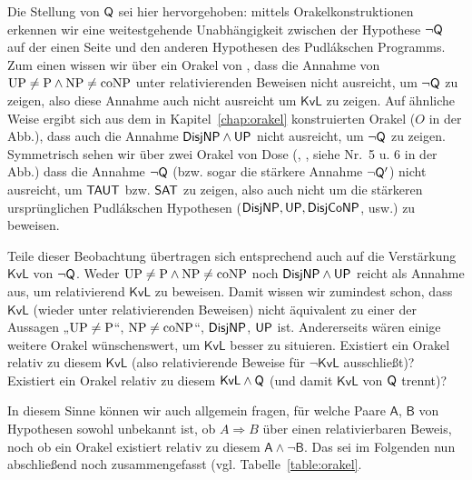 Die Stellung von $\mathsf{Q}$ sei hier hervorgehoben: mittels Orakelkonstruktionen erkennen wir eine weitestgehende Unabhängigkeit zwischen der Hypothese $\neg\mathsf{Q}$ auf der einen Seite und den anderen Hypothesen des Pudlákschen Programms. Zum einen wissen wir über ein Orakel von \textcite[Thm.~12.3, Nr.~8 in der Abb.]{fenner_inverting_2003}, dass die Annahme von $\mathrm{UP}\neq\mathrm{P}\land \mathrm{NP}\neq\mathrm{coNP}$ unter relativierenden Beweisen nicht ausreicht, um $\neg\mathsf{Q}$ zu zeigen, also diese Annahme auch nicht ausreicht um $\mathsf{KvL}$ zu zeigen.
Auf ähnliche Weise ergibt sich aus dem in Kapitel~\ref{chap:orakel} konstruierten Orakel ($O$ in der Abb.), dass auch die Annahme $\mathsf{DisjNP}\land\mathsf{UP}$ nicht ausreicht, um $\neg\mathsf{Q}$ zu zeigen.
Symmetrisch sehen wir über zwei Orakel von Dose (\cite*[Cor.~3.3]{dose_oracle_2020}, \cite*[Thm.~3.2]{dose_further_2020}, siehe Nr.~5 u. 6 in der Abb.) dass die Annahme $\neg\mathsf{Q}$ (bzw. sogar die stärkere Annahme $\neg\mathsf{Q}'$) nicht ausreicht, um $\mathsf{TAUT}$ bzw. $\mathsf{SAT}$ zu zeigen, also auch nicht um die stärkeren ursprünglichen Pudlákschen Hypothesen ($\mathsf{DisjNP}, \mathsf{UP}, \mathsf{DisjCoNP}$, usw.) zu beweisen.

Teile dieser Beobachtung übertragen sich entsprechend auch auf die Verstärkung $\mathsf{KvL}$ von $\neg\mathsf{Q}$. Weder $\mathrm{UP}\neq\mathrm{P}\land \mathrm{NP}\neq\mathrm{coNP}$ noch $\mathsf{DisjNP}\land\mathsf{UP}$ reicht als Annahme aus, um relativierend $\mathsf{KvL}$ zu beweisen.
Damit wissen wir zumindest schon, dass $\mathsf{KvL}$ (wieder unter relativierenden Beweisen) nicht äquivalent zu einer der Aussagen „$\mathrm{UP}\neq \mathrm{P}$“, $\mathrm{NP}\neq\mathrm{coNP}$“, $\mathsf{DisjNP}$, $\mathsf{UP}$ ist.
Andererseits wären einige weitere Orakel wünschenswert, um $\mathsf{KvL}$ besser zu situieren. Existiert ein Orakel relativ zu diesem $\mathsf{KvL}$ (also relativierende Beweise für $\neg\mathsf{KvL}$ ausschließt)? Existiert ein Orakel relativ zu diesem $\mathsf{KvL}\land \mathsf{Q}$ (und damit $\mathsf{KvL}$ von $\mathsf{Q}$ trennt)? 

In diesem Sinne können wir auch allgemein fragen, für welche Paare $\mathsf{A}$, $\mathsf{B}$ von Hypothesen sowohl unbekannt ist, ob $A\Rightarrow B$ über einen relativierbaren Beweis, noch ob ein Orakel existiert relativ zu diesem $\mathsf{A\land \neg B}$.
Das sei im Folgenden nun abschließend noch zusammengefasst (vgl. Tabelle~\ref{table:orakel}.

